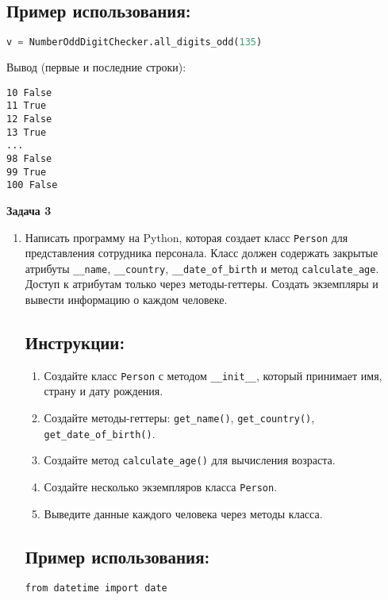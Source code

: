 \begin{enumerate}
\subsection*{Пример использования:}
\begin{lstlisting}[language=Python]
    v = NumberOddDigitChecker.all_digits_odd(135)
\end{lstlisting}
Вывод (первые и последние строки):
\begin{verbatim}
10 False
11 True
12 False
13 True
...
98 False
99 True
100 False
\end{verbatim}


\end{enumerate}

\textbf{Задача 3}

\begin{enumerate}

\item
Написать программу на Python, которая создает класс \texttt{Person} для представления сотрудника персонала. Класс должен содержать закрытые атрибуты \texttt{\_\_name}, \texttt{\_\_country}, \texttt{\_\_date\_of\_birth} и метод \texttt{calculate\_age}. Доступ к атрибутам только через методы-геттеры. Создать экземпляры и вывести информацию о каждом человеке.

\subsection*{Инструкции:}
\begin{enumerate}
    \item Создайте класс \texttt{Person} с методом \texttt{\_\_init\_\_}, который принимает имя, страну и дату рождения.
    \item Создайте методы-геттеры: \texttt{get\_name()}, \texttt{get\_country()}, \texttt{get\_date\_of\_birth()}.
    \item Создайте метод \texttt{calculate\_age()} для вычисления возраста.
    \item Создайте несколько экземпляров класса \texttt{Person}.
    \item Выведите данные каждого человека через методы класса.
\end{enumerate}

\subsection*{Пример использования:}
\begin{lstlisting}[caption=Пример кода]
from datetime import date


\end{lstlisting}
\end{enumerate}
